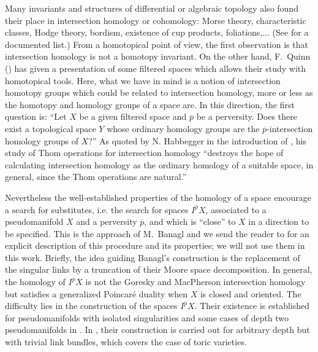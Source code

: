 \documentclass[a4paper,10pt,english,reqno]{amsart}
\theoremstyle{plain}
\theoremstyle{definition}
\theoremstyle{remark}
\numberwithin{equation}{section}
\def\ov{\overline}
\renewcommand\1{\hbox{\ding{192}}}
\renewcommand\2{\hbox{\ding{193}}}
\newcommand\3{\hbox{\ding{194}}}
\newcommand\4{\hbox{\ding{195}}}
\begin{document}
\smallskip
Many invariants and structures of differential or algebraic topology also
 found their place in intersection homology or cohomology: 
 Morse theory, characteristic classes, Hodge theory, bordism, existence of cup products, foliations,...
%
(See \cite[Chapter 10]{FriedmanBook} for a  documented list.) 
From a homotopical point of view, the first observation is that  intersection homology
is not a homotopy invariant. 
On the other hand,   F.~Quinn (\cite{Qui}) has given a  presentation of some filtered spaces
which allows their study with homotopical tools. 
Here, what we have in mind is a notion of intersection homotopy groups 
which could be related to intersection homology, more or less as
 the homotopy and homology groups of a space are. 
 In this direction, the first question is:
 ``Let $X$ be a given filtered space and $\ov{p}$ be a perversity. 
 Does there exist a topological space $Y$ whose ordinary homology groups are the $\ov{p}$-intersection homology groups of $X$?''
As quoted by N. Habbegger  in the introduction of \cite{MR826504}, his study of Thom operations 
for intersection homology ``destroys the hope of calculating intersection homology 
as the ordinary homology of a suitable space, in general, since the Thom operations are natural.''
%
%

\smallskip
Nevertheless the well-established properties of the homology of a space encourage a search for substitutes, 
i.e. the search for spaces $I^{\ov{p}}X$, associated to a pseudomanifold $X$ and a
perversity $\ov{p}$, and which is   ``close'' to $X$  in a direction to be specified. 
This is the approach of M.~Banagl and we send the reader to \cite{MR2662593} 
for an explicit description of this procedure and its properties; we will not use them in this work.
 Briefly, the idea guiding Banagl's construction is the replacement of the singular links by 
 a truncation of their Moore space decomposition.
 In general, the homology of $I^{\overline{p}}X$ is not the Goresky and MacPherson intersection homology
 but satisfies a generalized Poincar\'e duality when $X$ is closed and oriented.
 The  difficulty lies in the construction of the spaces $I^{\ov{p}}X$.
 Their existence is established for pseudomanifolds with isolated singularities and 
 some cases of depth two pseudomanifolds in \cite{MR2662593,MR2928934,MR4243079}.
 In \cite{MR4170059}, their construction is carried out for arbitrary depth but with trivial link bundles, 
 which covers the case of toric varieties.
 
\end{document}
